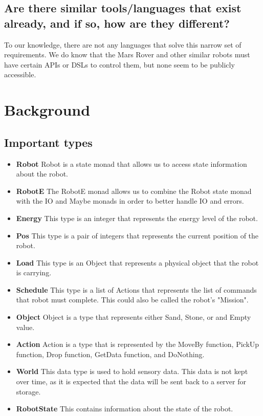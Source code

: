 \documentclass{sig-alternate-05-2015}
\begin{document}
\subsection{Are there similar tools/languages that exist already, and if so, how are they different?}
To our knowledge, there are not any languages that solve this narrow set of requirements. We do know that the Mars Rover and other similar robots must have certain APIs or DSLs to control them, but none seem to be publicly accessible.

\section{Background}
\subsection{Important types}
\begin{itemize}
\item \textbf{Robot}
Robot is a state monad that allows us to access state information about the robot.
\item \textbf{RobotE}
The RobotE monad allows us to combine the Robot state monad with the IO and Maybe monads in order to better handle IO and errors.
\item \textbf{Energy}
This type is an integer that represents the energy level of the robot.
\item \textbf{Pos}
This type is a pair of integers that represents the current position of the robot.
\item \textbf{Load}
This type is an Object that represents a physical object that the robot is carrying.
\item \textbf{Schedule}
This type is a list of Actions that represents the list of commands that robot must complete. This could also be called the robot's "Mission".
\item \textbf{Object}
Object is a type that represents either Sand, Stone, or and Empty value.
\item \textbf{Action}
Action is a type that is represented by the MoveBy function, PickUp function, Drop function, GetData function, and DoNothing.
\item \textbf{World}
This data type is used to hold sensory data. This data is not kept over time, as it is expected that the data will be sent back to a server for storage.
\item \textbf{RobotState}
This contains information about the state of the robot.
\end{itemize}
\end{document}
